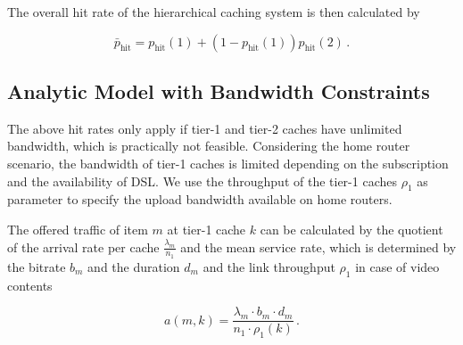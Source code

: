 

The overall hit rate of the hierarchical caching system is then calculated by

\begin{equation}
\bar{p}_\text{hit} = p_\text{hit}(1)+(1-p_\text{hit}(1))p_\text{hit}(2) \, .
\end{equation}


\subsection{Analytic Model with Bandwidth Constraints}

The above hit rates only apply if tier-1 and tier-2 caches have unlimited bandwidth, which is practically not feasible.
Considering the home router scenario, the bandwidth of tier-1 caches is limited depending on the subscription and the availability of DSL.
We use the throughput of the tier-1 caches $\rho_1$ as parameter to specify the upload bandwidth available on home routers.




The offered traffic of item $m$ at tier-1 cache $k$ can be calculated by the quotient of the arrival rate per cache $\frac{\lambda_m}{n_1}$ and the mean service rate, which is determined by the bitrate $b_m$ and the duration $d_m$ and the link throughput $\rho_1$ in case of video contents

\begin{equation}
a(m,k) = \frac{\lambda_m \cdot b_m \cdot d_m}{n_1\cdot \rho_1(k)} \, .
\end{equation}

